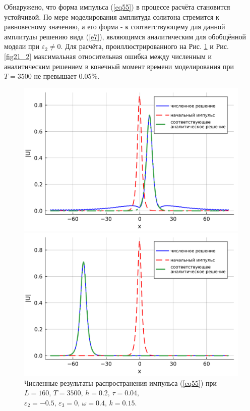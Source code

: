 \documentclass[14pt,a4paper]{extreport}
\begin{document}
			Обнаружено, что форма импульса (\ref{eq55}) в процессе расчёта становится устойчивой. По мере моделирования амплитуда солитона стремится к равновесному значению, а его форма - к соответствующему для данной амплитуды решению вида (\ref{e7}), являющимся аналитическим для обобщённой модели при \(\varepsilon_{2}\ne 0\). Для расчёта, проиллюстрированного на Рис. \ref{fig21_1} и Рис. \ref{fig21_2} максимальная относительная ошибка между численным и аналитическим решением в конечный момент времени моделирования при \(T=3500\) не превышает 0.05\%.
			\begin{figure}[H] %
				\begin{center}
					\begin{minipage}[h]{0.48\linewidth}
						\includegraphics[width=1\linewidth]{Medvedev_fig10.png}
					\end{minipage}
					\hfill
					\begin{minipage}[h]{0.48\linewidth}
						\includegraphics[width=1\linewidth]{Medvedev_fig19.png}
					\end{minipage}
				\end{center}
				\caption{Численные результаты распространения импульса (\ref{eq55}) при
				\(L=160,\, T=3500,\, h=0.2,\, \tau=0.04,\)
				\(\varepsilon_{2}=-0.5,\,\varepsilon_{3}=0,\, \omega=0.4,\, k=0.15\).}
				\label{fig21_1}
			\end{figure}
\end{document}
